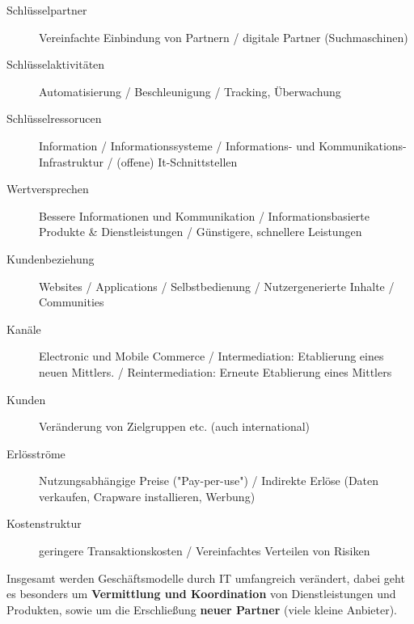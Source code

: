     \begin{description}

        \item[Schlüsselpartner]
            Vereinfachte Einbindung von Partnern / digitale Partner (Suchmaschinen)

        \item[Schlüsselaktivitäten]
            Automatisierung / Beschleunigung / Tracking, Überwachung

        \item[Schlüsselressorucen]
            Information / Informationssysteme / Informations- und Kommunikations-Infrastruktur /
            (offene) It-Schnittstellen

        \item[Wertversprechen]
            Bessere Informationen und Kommunikation / Informationsbasierte Produkte \& Dienstleistungen /
            Günstigere, schnellere Leistungen

        \item[Kundenbeziehung]
            Websites / Applications / Selbstbedienung / Nutzergenerierte Inhalte / Communities

        \item[Kanäle]
            Electronic und Mobile Commerce / Intermediation: Etablierung eines neuen Mittlers.
            / Reintermediation: Erneute Etablierung eines Mittlers

        \item[Kunden]
            Veränderung von Zielgruppen etc. (auch international)

        \item[Erlösströme]
            Nutzungsabhängige Preise ("Pay-per-use") /
            Indirekte Erlöse (Daten verkaufen, Crapware installieren, Werbung)

        \item[Kostenstruktur]
            geringere Transaktionskosten / Vereinfachtes Verteilen von Risiken

    \end{description}

    Insgesamt werden Geschäftsmodelle durch IT umfangreich verändert, dabei geht es
    besonders um \textbf{Vermittlung und Koordination} von Dienstleistungen und Produkten,
    sowie um die Erschließung \textbf{neuer Partner} (viele kleine Anbieter).
